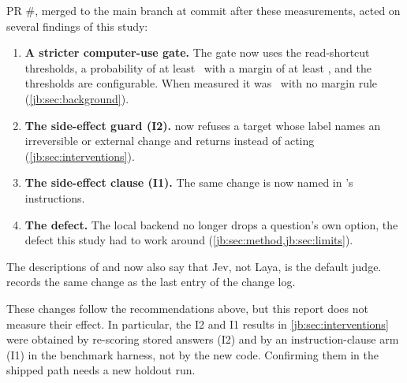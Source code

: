 PR \#\SincePR, merged to the main branch at commit \code{\SinceCommit} after these measurements, acted
on several findings of this study:
\begin{enumerate}[label=(\alph*)]
  \item \textbf{A stricter computer-use gate.} The  gate now uses the read-shortcut
    thresholds, a probability of at least \MinP\ with a margin of at least \MinMargin, and the thresholds
    are configurable. When measured it was \CuaMinP\ with no margin rule (\cref{jb:sec:background}).
  \item \textbf{The side-effect guard (I2).}  now refuses a target whose label names an
    irreversible or external change and returns  instead of
    acting (\cref{jb:sec:interventions}).
  \item \textbf{The side-effect clause (I1).} The same change is now named in 's
    instructions.
  \item \textbf{The  defect.} The local backend no longer drops a question's own
     option, the defect this study had to work around (\cref{jb:sec:method,jb:sec:limits}).
\end{enumerate}
The descriptions of  and  now also say that Jev, not Laya, is the default
judge.  records the same change as the last entry of the change log.

These changes follow the recommendations above, but this report does not measure their effect. In
particular, the I2 and I1 results in \cref{jb:sec:interventions} were obtained by re-scoring stored answers
(I2) and by an instruction-clause arm (I1) in the benchmark harness, not by the new  code.
Confirming them in the shipped path needs a new holdout run.
